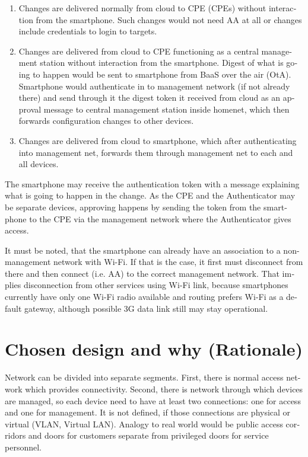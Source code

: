 \documentclass[12pt,a4paper,english]{tutthesis}
\begin{document}
\begin{otherlanguage}{english}
\begin{enumerate}
\item Changes are delivered normally from cloud to CPE (CPEs) without
interaction from the smartphone. Such changes would not need
AA at all or changes include credentials to login to targets.

\item Changes are delivered from cloud to CPE functioning as a central
management station without interaction from the smartphone.  Digest
of what is going to happen would be sent to smartphone from BaaS
over the air (OtA). Smartphone would authenticate in to management
network (if not already there) and send through it the digest token
it received from cloud as an approval message to central management
station inside homenet, which then forwards configuration changes
to other devices.

\item Changes are delivered from cloud to smartphone, which after
authenticating into management net, forwards them through management
net to each and all devices.
\end{enumerate}


The smartphone may receive the authentication token with 
a message explaining what is going to happen in the change.
As the CPE and the Authenticator may be separate devices, approving
happens by sending the token from the smartphone to the CPE via the
management network where the Authenticator gives access.

It must be noted, that the smartphone can already have an association
to a non-management network with Wi-Fi. If that is the case, it first
must disconnect from there and then connect (i.e. AA) to the correct management
network. That implies disconnection from other services using Wi-Fi
link, because smartphones currently have only one Wi-Fi radio
available and routing prefers Wi-Fi as a default gateway, although
possible 3G data link still may stay operational.


\section{Chosen design and why (Rationale)}
\label{sec-4-3}
\label{sec:chosendesign}   
Network can be divided into separate segments. 
First, there is normal access network which provides
connectivity. Second, there is network through which devices are
managed, so each device need to have at least two connections: one for
access and one for management. It is not defined, if those connections
are physical or virtual (VLAN, Virtual LAN). 
Analogy to real world would be public access corridors and doors for
customers separate from privileged doors for service personnel.


\end{otherlanguage}
\end{document}
